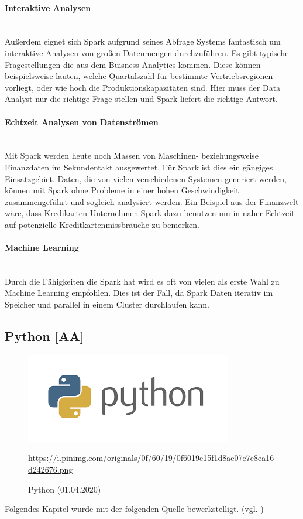 \paragraph{Interaktive Analysen}\mbox{} \\
Außerdem eignet sich Spark aufgrund seines Abfrage Systems fantastisch um interaktive Analysen von großen Datenmengen durchzuführen. Es gibt typische Fragestellungen die aus dem Buisness Analytics kommen. Diese können beispielsweise lauten, welche Quartalszahl für bestimmte Vertriebsregionen vorliegt, oder wie hoch die Produktionskapazitäten sind. Hier muss der Data Analyst nur die richtige Frage stellen und Spark liefert die richtige Antwort. 
\paragraph{Echtzeit Analysen von Datenströmen}\mbox{} \\
Mit Spark werden heute noch Massen von Maschinen- beziehungsweise Finanzdaten im Sekundentakt ausgewertet. Für Spark ist dies ein gängiges Einsatzgebiet. Daten, die von vielen verschiedenen Systemen generiert werden, können mit Spark ohne Probleme in einer hohen Geschwindigkeit zusammengeführt und sogleich analysiert werden. Ein Beispiel aus der Finanzwelt wäre, dass Kredikarten Unternehmen Spark dazu benutzen um in naher Echtzeit auf potenzielle Kreditkartenmissbräuche zu bemerken. 
\paragraph{Machine Learning}\mbox{} \\
Durch die Fähigkeiten die Spark hat wird es oft von vielen als erste Wahl zu Machine Learning empfohlen. Dies ist der Fall, da Spark Daten iterativ im Speicher und parallel in einem Cluster durchlaufen kann.

\subsection{Python [AA]}
\begin{figure}[H]
\centering
  \includegraphics[scale=0.75]{images/python.png}
  \caption[Python (01.04.2020)]{Python (01.04.2020)}
  \url{https://i.pinimg.com/originals/0f/60/19/0f6019e15f1d8ae07e7e8ea16d242676.png}
  \label{fig:Python}
\end{figure}
Folgendes Kapitel wurde mit der folgenden Quelle bewerkstelligt. (vgl. \cite{bigdata_python_2020})

